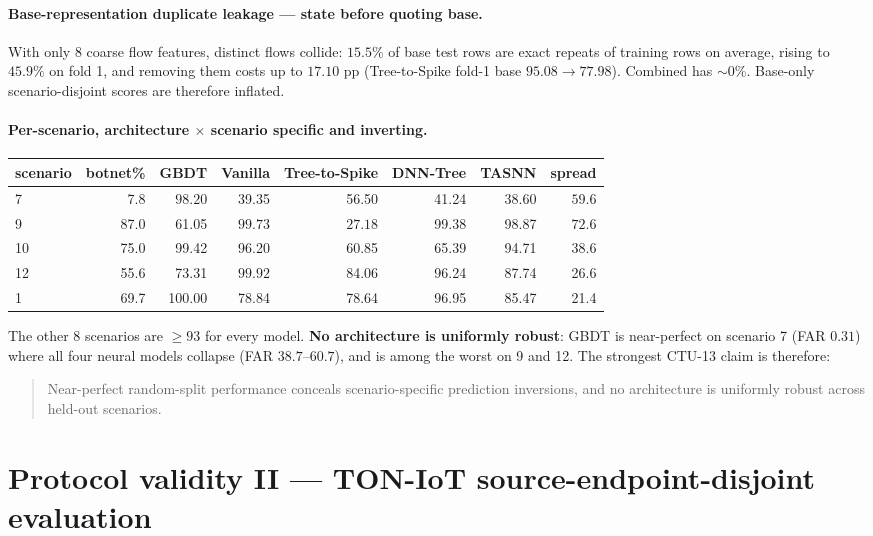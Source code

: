 \paragraph{$\!$Base-representation duplicate leakage --- state before quoting base.} With
only 8 coarse flow features, distinct flows collide: $15.5\%$ of base test rows are exact
repeats of training rows on average, rising to $\mathbf{45.9\%}$ on fold 1, and removing
them costs up to $\mathbf{17.10}$ pp (Tree-to-Spike fold-1 base $95.08 \rightarrow 77.98$).
Combined has $\sim$0\%. Base-only scenario-disjoint scores are therefore inflated.

\paragraph{Per-scenario, architecture $\times$ scenario specific and inverting.}
\begin{center}\small
\begin{tabular}{lrrrrrrr}\toprule
scenario & botnet\% & GBDT & Vanilla & Tree-to-Spike & DNN-Tree & TASNN & spread \\\midrule
7  &  7.8 & $\mathbf{98.20}$ & 39.35 & 56.50 & 41.24 & 38.60 & $\mathbf{59.6}$ \\
9  & 87.0 & 61.05 & $\mathbf{99.73}$ & $\mathbf{27.18}$ & 99.38 & 98.87 & $\mathbf{72.6}$ \\
10 & 75.0 & 99.42 & 96.20 & 60.85 & 65.39 & 94.71 & 38.6 \\
12 & 55.6 & 73.31 & $\mathbf{99.92}$ & 84.06 & 96.24 & 87.74 & 26.6 \\
1  & 69.7 & 100.00 & 78.84 & 78.64 & 96.95 & 85.47 & 21.4 \\
\bottomrule\end{tabular}\end{center}
The other 8 scenarios are $\geq93$ for every model. \textbf{No architecture is uniformly
robust}: GBDT is near-perfect on scenario 7 (FAR $0.31$) where all four neural models
collapse (FAR $38.7$--$60.7$), and is among the worst on 9 and 12. The strongest CTU-13
claim is therefore:
\begin{quote}
Near-perfect random-split performance conceals scenario-specific prediction inversions,
and no architecture is uniformly robust across held-out scenarios.
\end{quote}

\section*{Protocol validity II --- TON-IoT source-endpoint-disjoint evaluation}


